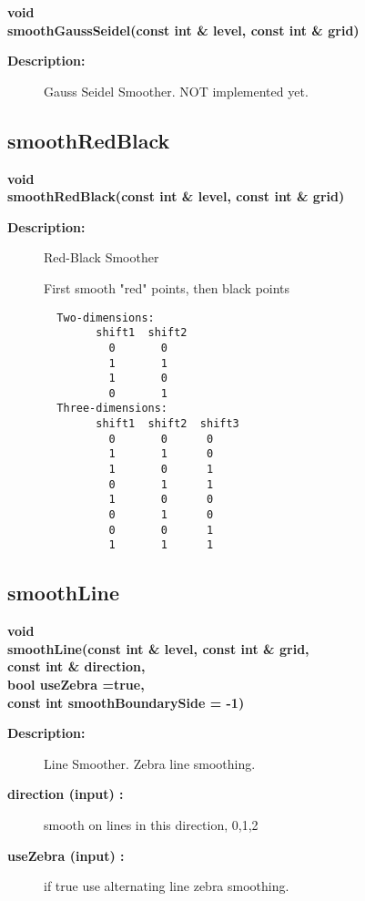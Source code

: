 \begin{flushleft} \textbf{%
void  \\ 
\settowidth{\OgmgIncludeArgIndent}{smoothGaussSeidel(}%
smoothGaussSeidel(const int \& level, const int \& grid)
}\end{flushleft}
\begin{description}
\item[{\bf Description:}] 
    Gauss Seidel Smoother. NOT implemented yet.
\end{description}
\subsection{smoothRedBlack}
 
\begin{flushleft} \textbf{%
void  \\ 
\settowidth{\OgmgIncludeArgIndent}{smoothRedBlack(}%
smoothRedBlack(const int \& level, const int \& grid)
}\end{flushleft}
\begin{description}
\item[{\bf Description:}] 
    Red-Black Smoother

  First smooth "red" points, then black points

 \begin{verbatim}
  Two-dimensions:
        shift1  shift2 
          0       0
          1       1
          1       0
          0       1
  Three-dimensions:
        shift1  shift2  shift3 
          0       0      0
          1       1      0
          1       0      1
          0       1      1
          1       0      0
          0       1      0
          0       0      1
          1       1      1
 \end{verbatim}
\end{description}
\subsection{smoothLine}
 
\begin{flushleft} \textbf{%
void  \\ 
\settowidth{\OgmgIncludeArgIndent}{smoothLine(}%
smoothLine(const int \& level, const int \& grid, \\ 
\hspace{\OgmgIncludeArgIndent}const int \& direction, \\ 
\hspace{\OgmgIncludeArgIndent}bool useZebra  =true,\\ 
\hspace{\OgmgIncludeArgIndent}const int smoothBoundarySide  = -1)
}\end{flushleft}
\begin{description}
\item[{\bf Description:}] 
    Line Smoother. Zebra line smoothing.
    
\item[{\bf direction (input) :}]  smooth on lines in this direction, 0,1,2
\item[{\bf useZebra (input) :}]  if true use alternating line zebra smoothing.
\end{description}
